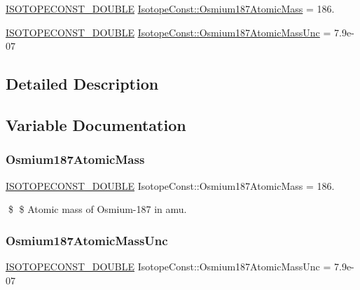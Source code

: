 \begin{DoxyCompactItemize}
\item 
\mbox{\hyperlink{group___isotope_const-_macros_ga8f45a7272ce02c0b4c65c44636ed719a}{I\+S\+O\+T\+O\+P\+E\+C\+O\+N\+S\+T\+\_\+\+D\+O\+U\+B\+LE}} \mbox{\hyperlink{group___isotope_const-_osmium-_os187_ga812e78a57da4f3b8e7eafd57568576fe}{Isotope\+Const\+::\+Osmium187\+Atomic\+Mass}} = 186.
\item 
\mbox{\hyperlink{group___isotope_const-_macros_ga8f45a7272ce02c0b4c65c44636ed719a}{I\+S\+O\+T\+O\+P\+E\+C\+O\+N\+S\+T\+\_\+\+D\+O\+U\+B\+LE}} \mbox{\hyperlink{group___isotope_const-_osmium-_os187_ga6cc62b45a2f15539c458d795688d2117}{Isotope\+Const\+::\+Osmium187\+Atomic\+Mass\+Unc}} = 7.\+9e-\/07
\end{DoxyCompactItemize}


\subsection{Detailed Description}


\subsection{Variable Documentation}
\mbox{\label{group___isotope_const-_osmium-_os187_ga812e78a57da4f3b8e7eafd57568576fe}} 
\subsubsection{\texorpdfstring{Osmium187\+Atomic\+Mass}{Osmium187AtomicMass}}
{\footnotesize\ttfamily \mbox{\hyperlink{group___isotope_const-_macros_ga8f45a7272ce02c0b4c65c44636ed719a}{I\+S\+O\+T\+O\+P\+E\+C\+O\+N\+S\+T\+\_\+\+D\+O\+U\+B\+LE}} Isotope\+Const\+::\+Osmium187\+Atomic\+Mass = 186.}

\$ \$ Atomic mass of Osmium-\/187 in amu. \mbox{\label{group___isotope_const-_osmium-_os187_ga6cc62b45a2f15539c458d795688d2117}} 
\subsubsection{\texorpdfstring{Osmium187\+Atomic\+Mass\+Unc}{Osmium187AtomicMassUnc}}
{\footnotesize\ttfamily \mbox{\hyperlink{group___isotope_const-_macros_ga8f45a7272ce02c0b4c65c44636ed719a}{I\+S\+O\+T\+O\+P\+E\+C\+O\+N\+S\+T\+\_\+\+D\+O\+U\+B\+LE}} Isotope\+Const\+::\+Osmium187\+Atomic\+Mass\+Unc = 7.\+9e-\/07}

